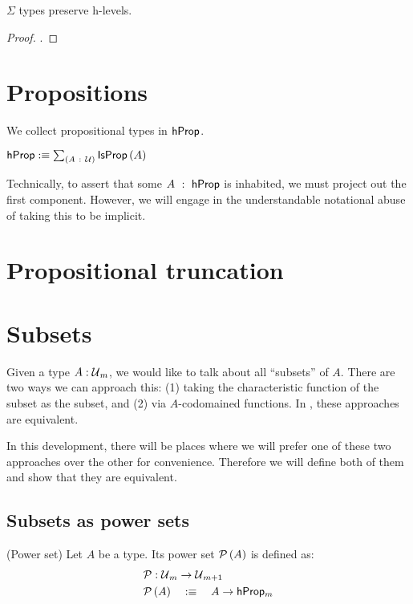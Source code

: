 \begin{prop}\label{isOfHLevelSigma}
  $\Sigma$ types preserve h-levels.
\end{prop}
\begin{proof}
  .
\end{proof}

\section{Propositions}

We collect propositional types in $\mathsf{hProp}{}$.

\begin{defn}\label{omega}
  $\mathsf{hProp}{} :\equiv \sum_{(A~:~\mathcal{U})} \mathsf{IsProp}\left(A\right)$
\end{defn}

Technically, to assert that some $A~:~\mathsf{hProp}{}$ is inhabited, we must project out the
first component. However, we will engage in the understandable notational abuse of taking
this to be implicit.

\section{Propositional truncation}


\section{Subsets}

Given a type $A : \mathcal{U}{}_m$, we would like to talk about all ``subsets'' of $A$. There
are two ways we can approach this: (1) taking the characteristic function of the subset as
the subset, and (2) via $A$-codomained functions. In \UF{}, these approaches are
equivalent.

In this development, there will be places where we will prefer one of these two approaches
over the other for convenience. Therefore we will define both of them and show that they
are equivalent.

\subsection{Subsets as power sets}

\begin{defn}(Power set)\label{defn:pow}
  Let $A$ be a type. Its power set $\mathcal{P}\left(A\right)$ is defined as:
  \begin{align*}
    &\mathcal{P} : \mathcal{U}{}_m \rightarrow \mathcal{U}{}_{m+1}\\
    &\mathcal{P}\left(A\right) \quad:\equiv\quad A \rightarrow \mathsf{hProp}{}_m
  \end{align*}
\end{defn}

